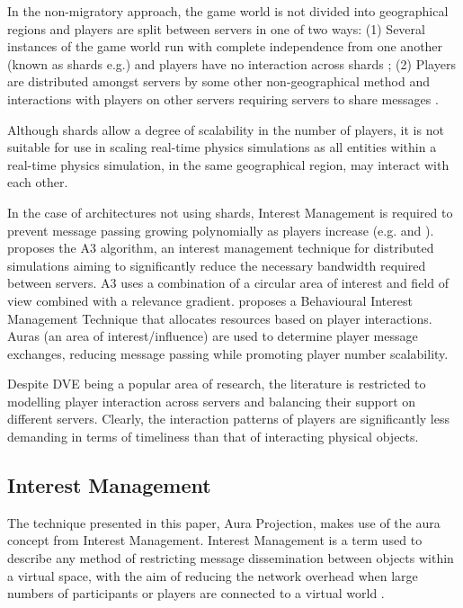 In the non-migratory approach, the game world is not divided into geographical regions and players are split between servers in one of two ways: (1) Several instances of the game world run with complete independence from one another (known as shards e.g.\cite{WOW}) and players have no interaction across shards \cite{P2PForMMOs}; (2) Players are distributed amongst servers by some other non-geographical method and interactions with players on other servers requiring servers to share messages \cite{LoadBalancingforMMOs}.

Although shards allow a degree of scalability in the number of players, it is not suitable for use in scaling real-time physics simulations as all entities within a real-time physics simulation, in the same geographical region, may interact with each other.

In the case of architectures not using shards, Interest Management is required to prevent message passing growing polynomially as players increase (e.g. \cite{Bezerra2008} and \cite{LoadBalancingforMMOs}).
\cite{Bezerra2008} proposes the A3 algorithm, an interest management technique for distributed simulations aiming to significantly reduce the necessary bandwidth required between servers. A3 uses a combination of a circular area of interest and field of view combined with a relevance gradient. \cite{LoadBalancingforMMOs} proposes a Behavioural Interest Management Technique that allocates resources based on player interactions. Auras (an area of interest/influence) are used to determine player message exchanges, reducing message passing while promoting player number scalability.

Despite DVE being a popular area of research, the literature is restricted to modelling player interaction across servers and balancing their support on different servers. Clearly, the interaction patterns of players are significantly less demanding in terms of timeliness than that of interacting physical objects.


\subsection{Interest Management}
The technique presented in this paper, Aura Projection, makes use of the aura concept from Interest Management. Interest Management is a term used to describe any method of restricting message dissemination between objects within a virtual space, with the aim of reducing the network overhead when large numbers of participants or players are connected to a virtual world \cite{Morgan2005}.

